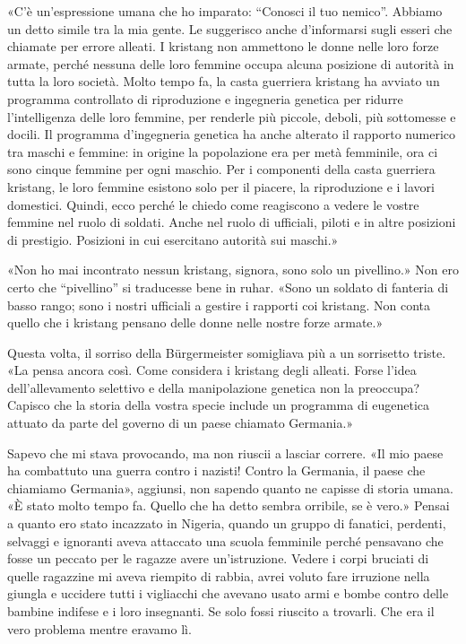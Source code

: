 «C'è un'espressione umana che ho imparato: ``Conosci il tuo nemico''.
Abbiamo un detto simile tra la mia gente. Le suggerisco anche
d'informarsi sugli esseri che chiamate per errore alleati. I kristang
non ammettono le donne nelle loro forze armate, perché nessuna delle
loro femmine occupa alcuna posizione di autorità in tutta la loro
società. Molto tempo fa, la casta guerriera kristang ha avviato un
programma controllato di riproduzione e ingegneria genetica per ridurre
l'intelligenza delle loro femmine, per renderle più piccole, deboli, più
sottomesse e docili. Il programma d'ingegneria genetica ha anche
alterato il rapporto numerico tra maschi e femmine: in origine la
popolazione era per metà femminile, ora ci sono cinque femmine per ogni
maschio. Per i componenti della casta guerriera kristang, le loro
femmine esistono solo per il piacere, la riproduzione e i lavori
domestici. Quindi, ecco perché le chiedo come reagiscono a vedere le
vostre femmine nel ruolo di soldati. Anche nel ruolo di ufficiali,
piloti e in altre posizioni di prestigio. Posizioni in cui esercitano
autorità sui maschi.»

«Non ho mai incontrato nessun kristang, signora, sono solo un
pivellino.» Non ero certo che ``pivellino'' si traducesse bene in ruhar.
«Sono un soldato di fanteria di basso rango; sono i nostri ufficiali a
gestire i rapporti coi kristang. Non conta quello che i kristang pensano
delle donne nelle nostre forze armate.»

Questa volta, il sorriso della Bürgermeister somigliava più a un
sorrisetto triste. «La pensa ancora così. Come considera i kristang
degli alleati. Forse l'idea dell'allevamento selettivo e della
manipolazione genetica non la preoccupa? Capisco che la storia della
vostra specie include un programma di eugenetica attuato da parte del
governo di un paese chiamato Germania.»

Sapevo che mi stava provocando, ma non riuscii a lasciar correre. «Il
mio paese ha combattuto una guerra contro i nazisti! Contro la Germania,
il paese che chiamiamo Germania», aggiunsi, non sapendo quanto ne
capisse di storia umana. «È stato molto tempo fa. Quello che ha detto
sembra orribile, se è vero.» Pensai a quanto ero stato incazzato in
Nigeria, quando un gruppo di fanatici, perdenti, selvaggi e ignoranti
aveva attaccato una scuola femminile perché pensavano che fosse un
peccato per le ragazze avere un'istruzione. Vedere i corpi bruciati di
quelle ragazzine mi aveva riempito di rabbia, avrei voluto fare
irruzione nella giungla e uccidere tutti i vigliacchi che avevano usato
armi e bombe contro delle bambine indifese e i loro insegnanti. Se solo
fossi riuscito a trovarli. Che era il vero problema mentre eravamo lì.

